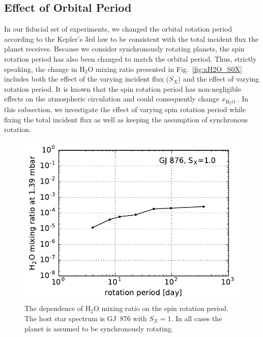 \documentclass[11pt,numberedappendix,twocolappendix,]{emulateapj}
\def\water{H$_2$O }
\def\xwater{$x_\text{\water}$}
\begin{document}
\subsection{Effect of Orbital Period}
\label{ss:sensitivity_Porbit}

In our fiducial set of experiments, we changed the orbital rotation period according to the Kepler's 3rd law to be consistent with the total incident flux the planet receives. 
Because we consider synchronously rotating planets, the spin rotation period has also been changed to match the orbital period. 
Thus, strictly speaking, the change in \water mixing ratio presented in Fig.~\ref{fig:xH2O_S0X} includes both the effect of the varying incident flux ($S_X$) and the effect of varying rotation period. 
It is known that the spin rotation period has non-negligible effects on the atmospheric circulation \citep{Yang2013, Kopparapu2016, Way2016} and could consequently change \xwater. 
In this subsection, we investigate the effect of varying spin rotation period while fixing the total incident flux as well as keeping the assumption of synchronous rotation. 


\begin{figure}[!h]
    \begin{center}
    \includegraphics[width=\hsize]{fig/xH2O_Prot.pdf}
    \end{center}
\caption{The dependence of \water mixing ratio on the spin rotation period. The host star spectrum is GJ~876 with $S_X=1$. In all cases the planet is assumed to be synchronously rotating. }
\label{fig:changeP}
\end{figure}
\end{document}
